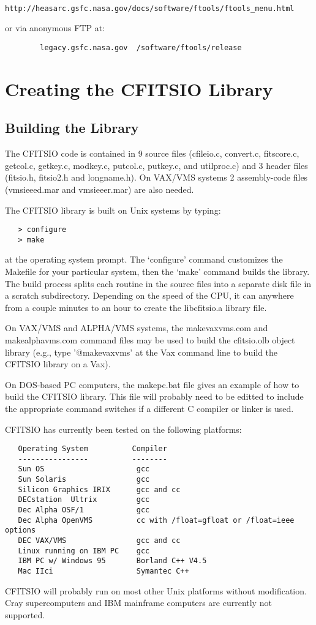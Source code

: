 \begin{verbatim}
        http://heasarc.gsfc.nasa.gov/docs/software/ftools/ftools_menu.html
\end{verbatim}
or via anonymous FTP at:

\begin{verbatim}
        legacy.gsfc.nasa.gov  /software/ftools/release
\end{verbatim}

\chapter{ Creating the CFITSIO Library }


\section{Building the Library}

The CFITSIO code is contained in 9 source files (cfileio.c, convert.c,
fitscore.c, getcol.c, getkey.c, modkey.c, putcol.c, putkey.c, and
utilproc.c) and 3 header files (fitsio.h, fitsio2.h and longname.h).
On VAX/VMS systems 2 assembly-code files (vmsieeed.mar and
vmsieeer.mar) are also needed.

The CFITSIO library is built on Unix systems by typing:

\begin{verbatim}
   > configure
   > make
\end{verbatim}
at the operating system prompt.  The `configure' command customizes
the Makefile for your particular system, then the `make' command
builds the library.  The build process splits each routine in the
source files into a separate disk file in a scratch subdirectory.
Depending on the speed of the CPU, it can anywhere from a couple
minutes to an hour to create the libcfitsio.a library file.

On VAX/VMS and ALPHA/VMS systems, the makevaxvms.com and makealphavms.com
command files may be used to build the cfitsio.olb object library
(e.g., type '@makevaxvms' at the Vax command line to build the CFITSIO
library on a Vax).

On DOS-based PC computers, the makepc.bat file gives an example
of how to build the CFITSIO library.  This file will probably
need to be editted to include the appropriate command switches
if a different C compiler or linker is used.

CFITSIO has currently been tested on the following platforms:

\begin{verbatim}
   Operating System          Compiler
   ----------------          --------
   Sun OS                     gcc
   Sun Solaris                gcc
   Silicon Graphics IRIX      gcc and cc
   DECstation  Ultrix         gcc
   Dec Alpha OSF/1            gcc
   Dec Alpha OpenVMS          cc with /float=gfloat or /float=ieee options
   DEC VAX/VMS                gcc and cc
   Linux running on IBM PC    gcc
   IBM PC w/ Windows 95       Borland C++ V4.5
   Mac IIci                   Symantec C++
\end{verbatim}
CFITSIO will probably run on most other Unix platforms without
modification.  Cray supercomputers and IBM mainframe computers are
currently not supported.



